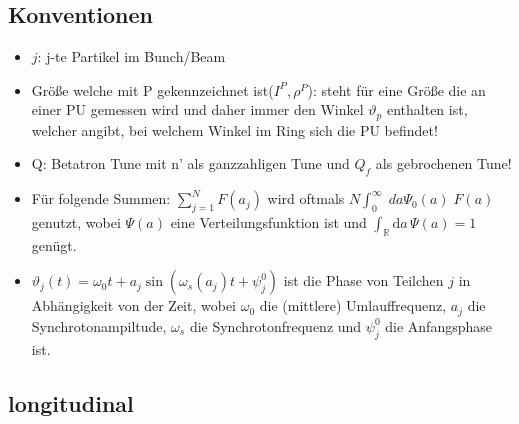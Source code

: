 \documentclass[12pt]{article}%
\renewcommand{\theta}{\vartheta}
\begin{document}
\subsection{Konventionen}
\begin{itemize}
	\item $j$: j-te Partikel im Bunch/Beam
	\item Größe welche mit P gekennzeichnet ist($I^P,\rho^P$): steht für eine Größe die an einer 
	PU gemessen wird und daher immer den Winkel $\theta_p$ enthalten ist, welcher angibt, 
	bei welchem Winkel im Ring sich die PU befindet! 
	
	\item Q: Betatron Tune mit n' als ganzzahligen Tune und $Q_f$ als gebrochenen Tune! 
		
	\item Für folgende Summen: $\sum_{j=1}^{N}F(a_j)$ wird oftmals $N\int_{0}^{\infty}\; da \Psi_0(a) \; F(a)$ genutzt, wobei $\Psi(a)$ eine Verteilungsfunktion ist und $\int_{\mathbb{R}} \mathrm{d}a \, \Psi(a) = 1$ genügt.
	
	\item $\theta_j(t) = \omega_0 t + a_j \sin( \omega_s(a_j)t + \psi_j^0)$ ist die Phase von Teilchen $j$ in Abhängigkeit von der Zeit, wobei $\omega_0$ die (mittlere) Umlauffrequenz, $a_j$ die Synchrotonampiltude, $\omega_s$ die Synchrotonfrequenz und $\psi_j^0$ die Anfangsphase ist.
	
\end{itemize}

\subsection{longitudinal} 
\end{document}

